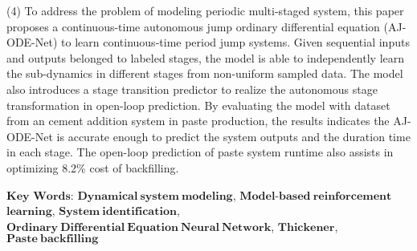 (4) To address the problem of modeling periodic multi-staged system, this paper proposes a continuous-time autonomous jump ordinary differential equation (AJ-ODE-Net) to learn continuous-time period jump systems.
Given sequential inputs and outputs belonged to labeled stages,
the model is able to independently learn the sub-dynamics in different stages from non-uniform sampled data. 
The model also introduces a stage transition predictor to realize the autonomous stage transformation in open-loop prediction. 
By evaluating the model with dataset from an cement  addition system in paste production, the results indicates the AJ-ODE-Net is accurate enough to predict the system outputs and the duration time in each stage.
The open-loop prediction of paste system runtime also assists in optimizing 8.2\% cost of backfilling.


\vskip 30bp
{
    $\mathbf{Key}$ $\mathbf{Words}$: 
    $\mathbf{Dynamical\ system\ modeling}$, 
    $\mathbf{Model}$-$\mathbf{based\ reinforcement}$
    $\mathbf{learning}$,
    $\mathbf{System\ identification}$, 
    $\mathbf{Ordinary\ Differential\ Equation\ Neural\ Network}$,
    $\mathbf{Thickener}$,
    $\mathbf{Paste\ backfilling}$
    
}

